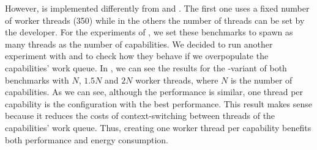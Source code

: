 However, \regex is implemented differently from \mandelbrot and \spectral. The first one uses a fixed number of worker threads (350) while in the others the number of threads can be set by the developer. For the experiments of , we set these benchmarks to spawn as many threads as the number of capabilities. We decided to run another experiment with \mandelbrot and \spectral to check how they behave if we overpopulate the capabilities' work queue. In , we can see the results for the \forkOn-\MVar variant of both benchmarks with $N$, $1.5N$ and $2N$ worker threads, where $N$ is the number of capabilities. As we can see, although the performance is similar, one thread per capability is the configuration with the best performance. This result makes sense because it reduces the costs of context-switching between threads of the capabilities' work queue. Thus, creating one worker thread per capability benefits both performance and energy consumption.

